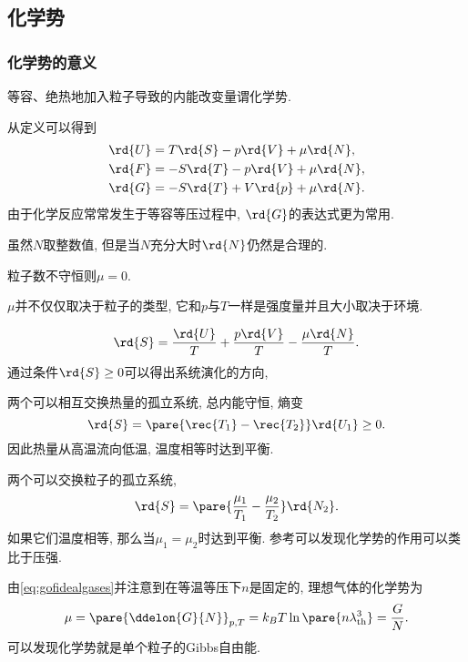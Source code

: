 \documentclass[../Thermal.tex]{subfiles}
\begin{document}
\subsection{化学势}
\subsubsection{化学势的意义}
\begin{definition}
等容、绝热地加入粒子导致的内能改变量谓化学势.
\end{definition}
从定义可以得到
\begin{align*}
\rd{U} &= T\rd{S} - p\rd{V} + \mu \rd{N},\\
\rd{F} &= -S\rd{T} - p\rd{V} + \mu \rd{N},\\
\rd{G} &= -S\rd{T} + V\rd{p} + \mu\rd{N}.
\end{align*}
由于化学反应常常发生于等容等压过程中, $\rd{G}$的表达式更为常用.
\begin{remark}
虽然$N$取整数值, 但是当$N$充分大时$\rd{N}$仍然是合理的.
\end{remark}
\begin{corollary}
\label{coll:muiszero}
粒子数不守恒则$\mu=0$.
\end{corollary}
\begin{pitfall}
$\mu$并不仅仅取决于粒子的类型, 它和$p$与$T$一样是强度量并且大小取决于环境.
\end{pitfall}
\begin{equation}
\label{eq:sinuvn}
\rd{S} = \frac{\rd{U}}{T} + \frac{p\rd{V}}{T} - \frac{\mu \rd{N}}{T}.
\end{equation}
通过条件$\rd{S}\ge 0$可以得出系统演化的方向,
\begin{ex}
两个可以相互交换热量的孤立系统, 总内能守恒, 熵变
\[ \rd{S} = \pare{\rec{T_1} - \rec{T_2}}\rd{U_1} \ge 0. \]
因此热量从高温流向低温, 温度相等时达到平衡.
\end{ex}
\begin{ex}
两个可以交换粒子的孤立系统,
\[ \rd{S} = \pare{\frac{\mu_1}{T_1} - \frac{\mu_2}{T_2}}\rd{N_2}. \]
如果它们温度相等, 那么当$\mu_1=\mu_2$时达到平衡. 参考可以发现化学势的作用可以类比于压强.
\end{ex}
\begin{ex}
\label{ex:muofidealgases}
由\eqref{eq:gofidealgases}并注意到在等温等压下$n$是固定的, 理想气体的化学势为
\[ \mu = \pare{\ddelon{G}{N}}_{p,T} = k_B T \ln\pare{n\lambda_{\mathrm{th}}^3} = \frac{G}{N}. \]
可以发现化学势就是单个粒子的Gibbs自由能.
\end{ex}
\end{document}
